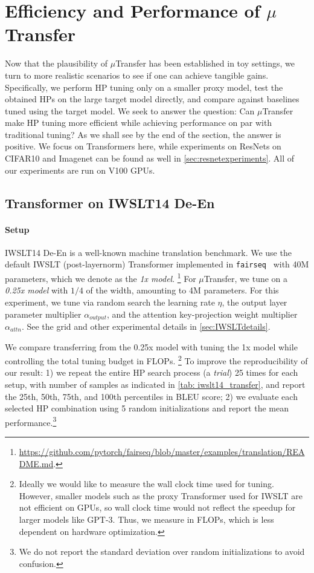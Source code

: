 \documentclass{article}
\theoremstyle{definition}
\begin{document}
\section{Efficiency and Performance of \texorpdfstring{$\mu$}{mu}Transfer}
\label{sec:transfermainresults}

Now that the plausibility of $\mu$Transfer has been established in toy settings, we turn to more realistic scenarios to see if one can achieve tangible gains.
Specifically, we perform HP tuning only on a smaller proxy model, test the obtained HPs on the large target model directly, and compare against baselines tuned using the target model.
We seek to answer the question: Can $\mu$Transfer make HP tuning more efficient while achieving performance on par with traditional tuning? %
As we shall see by the end of the section, the answer is positive.
We focus on Transformers here, while experiments on ResNets on CIFAR10 and Imagenet can be found as well in \cref{sec:resnetexperiments}.
All of our experiments are run on V100 GPUs.

\subsection{Transformer on IWSLT14 De-En}

\paragraph{Setup}
IWSLT14 De-En is a well-known machine translation benchmark.
We use the default IWSLT (post-layernorm) Transformer implemented in \texttt{fairseq}~\citep{ott2019fairseq} with 40M parameters, which we denote as the \emph{1x model}.%
\footnote{\url{https://github.com/pytorch/fairseq/blob/master/examples/translation/README.md}.}
For $\mu$Transfer, we tune on a \emph{0.25x model} with $1/4$ of the width, amounting to 4M parameters.
For this experiment, we tune via random search the learning rate $\eta$, the output layer parameter multiplier $\alpha_{output}$, and the attention key-projection weight multiplier $\alpha_{attn}$.
See the grid and other experimental details in \cref{sec:IWSLTdetails}.

We compare transferring from the 0.25x model with tuning the 1x model while controlling the total tuning budget in FLOPs.%
\footnote{Ideally we would like to measure the wall clock time used for tuning.
However, smaller models such as the proxy Transformer used for IWSLT are not efficient on GPUs, so wall clock time would not reflect the speedup for larger models like GPT-3.
Thus, we measure in FLOPs, which is less dependent on hardware optimization.}
To improve the reproducibility of our result: 1) we repeat the entire HP search process (a \emph{trial}) 25 times for each setup, with number of samples as indicated in \cref{tab: iwslt14_transfer}, and report the 25th, 50th, 75th, and 100th percentiles in BLEU score; 2) we evaluate each selected HP combination using 5 random initializations and report the mean performance.\footnote{We do not report the standard deviation over random initializations to avoid confusion.}
\end{document}
